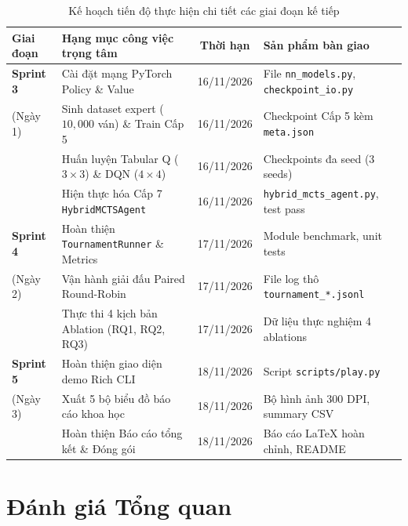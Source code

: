 \documentclass[a4paper,12pt]{report}
\begin{document}
\begin{table}[H]
\centering
\small
\caption{Kế hoạch tiến độ thực hiện chi tiết các giai đoạn kế tiếp}
\label{tab:schedule}
\vspace{0.2cm}
\begin{tabular}{lp{6.2cm}cp{3.8cm}}
\toprule
\textbf{Giai đoạn} & \textbf{Hạng mục công việc trọng tâm} & \textbf{Thời hạn} & \textbf{Sản phẩm bàn giao} \\
\midrule
\textbf{Sprint 3} & Cài đặt mạng PyTorch Policy \& Value & 16/11/2026 & File \texttt{nn\_models.py}, \texttt{checkpoint\_io.py} \\
(Ngày 1) & Sinh dataset expert ($10{,}000$ ván) \& Train Cấp 5 & 16/11/2026 & Checkpoint Cấp 5 kèm \texttt{meta.json} \\
          & Huấn luyện Tabular Q ($3 \times 3$) \& DQN ($4 \times 4$) & 16/11/2026 & Checkpoints đa seed (3 seeds) \\
          & Hiện thực hóa Cấp 7 \texttt{HybridMCTSAgent} & 16/11/2026 & \texttt{hybrid\_mcts\_agent.py}, test pass \\
\midrule
\textbf{Sprint 4} & Hoàn thiện \texttt{TournamentRunner} \& Metrics & 17/11/2026 & Module benchmark, unit tests \\
(Ngày 2) & Vận hành giải đấu Paired Round-Robin & 17/11/2026 & File log thô \texttt{tournament\_*.jsonl} \\
          & Thực thi 4 kịch bản Ablation (RQ1, RQ2, RQ3) & 17/11/2026 & Dữ liệu thực nghiệm 4 ablations \\
\midrule
\textbf{Sprint 5} & Hoàn thiện giao diện demo Rich CLI & 18/11/2026 & Script \texttt{scripts/play.py} \\
(Ngày 3) & Xuất 5 bộ biểu đồ báo cáo khoa học & 18/11/2026 & Bộ hình ảnh 300 DPI, summary CSV \\
          & Hoàn thiện Báo cáo tổng kết \& Đóng gói & 18/11/2026 & Báo cáo LaTeX hoàn chỉnh, README \\
\bottomrule
\end{tabular}
\end{table}

\clearpage
\section{Đánh giá Tổng quan}
\end{document}
